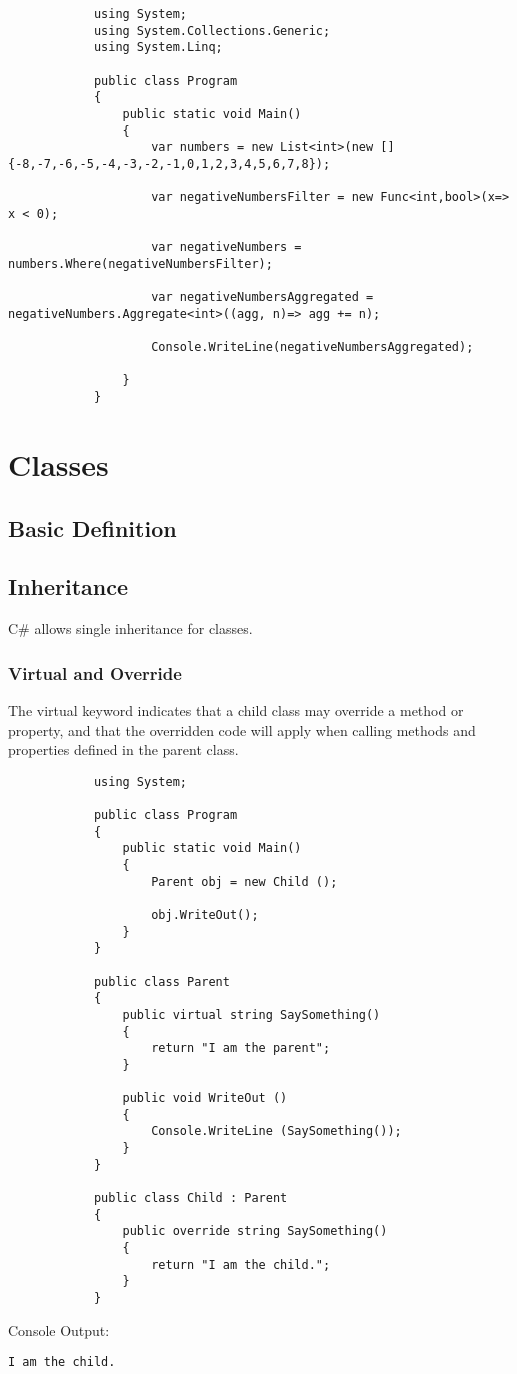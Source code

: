 \documentclass {amsart}
\begin{document}
	\begin{lstlisting}
			using System;
			using System.Collections.Generic;
			using System.Linq;
			
			public class Program
			{
				public static void Main()
				{
					var numbers = new List<int>(new [] {-8,-7,-6,-5,-4,-3,-2,-1,0,1,2,3,4,5,6,7,8});
			
					var negativeNumbersFilter = new Func<int,bool>(x=> x < 0);
			
					var negativeNumbers = numbers.Where(negativeNumbersFilter);
			
					var negativeNumbersAggregated = negativeNumbers.Aggregate<int>((agg, n)=> agg += n);
			
					Console.WriteLine(negativeNumbersAggregated);
					
				}
			}
	\end{lstlisting}



\section{Classes}
	\subsection{Basic Definition}
	\subsection{Inheritance}  C\# allows single inheritance for classes.  
		\subsubsection{Virtual and Override}  The virtual keyword indicates that a child class may override a method or property, and that the overridden code will apply when calling methods and properties defined in the parent class. 
			\begin{lstlisting}
			using System;
								
			public class Program
			{
				public static void Main()
				{
					Parent obj = new Child ();
					
					obj.WriteOut();
				}
			}

			public class Parent 
			{
				public virtual string SaySomething()
				{
					return "I am the parent";		
				}
				
				public void WriteOut () 
				{
					Console.WriteLine (SaySomething());	
				}
			}

			public class Child : Parent
			{
				public override string SaySomething()
				{
					return "I am the child.";		
				}
			}
			\end{lstlisting}
		Console Output:
		\begin{verbatim}I am the child.\end{verbatim}
\end{document}
